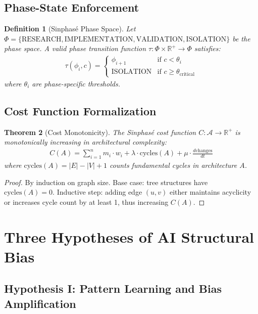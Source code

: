 \documentclass{article}
\newtheorem{theorem}{Theorem}
\newtheorem{definition}[theorem]{Definition}
\begin{document}
\subsection{Phase-State Enforcement}

\begin{definition}[Sinphasé Phase Space]
Let $\Phi = \{\text{RESEARCH}, \text{IMPLEMENTATION}, \text{VALIDATION}, \text{ISOLATION}\}$ be the phase space. A valid phase transition function $\tau: \Phi \times \mathbb{R}^+ \rightarrow \Phi$ satisfies:
\begin{align}
\tau(\phi_i, c) = \begin{cases}
\phi_{i+1} & \text{if } c < \theta_i \\
\text{ISOLATION} & \text{if } c \geq \theta_{\text{critical}}
\end{cases}
\end{align}
where $\theta_i$ are phase-specific thresholds.
\end{definition}

\subsection{Cost Function Formalization}

\begin{theorem}[Cost Monotonicity]
The Sinphasé cost function $C: \mathcal{A} \rightarrow \mathbb{R}^+$ is monotonically increasing in architectural complexity:
\begin{align}
C(A) = \sum_{i=1}^n m_i \cdot w_i + \lambda \cdot \text{cycles}(A) + \mu \cdot \frac{d\text{changes}}{dt}
\end{align}
where $\text{cycles}(A) = |E| - |V| + 1$ counts fundamental cycles in architecture $A$.
\end{theorem}

\begin{proof}
By induction on graph size. Base case: tree structures have $\text{cycles}(A) = 0$. Inductive step: adding edge $(u,v)$ either maintains acyclicity or increases cycle count by at least 1, thus increasing $C(A)$.
\end{proof}

\section{Three Hypotheses of AI Structural Bias}

\subsection{Hypothesis I: Pattern Learning and Bias Amplification}
\end{document}
